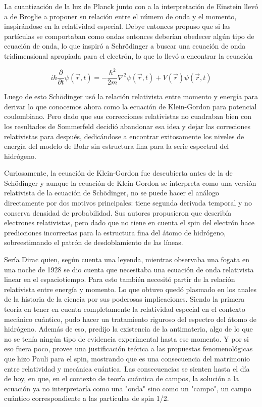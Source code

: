 \documentclass[a4paper, 12pt]{article} %
\begin{document}
La cuantizaci\'on de la luz de Planck junto con a la interpretaci\'on de Einstein llev\'o a de Broglie a proponer su relaci\'on entre el n\'umero de onda y el momento, inspir\'andose en la relatividad especial. Debye entonces propuso que si las part\'iculas se comportaban como ondas entonces deber\'ian obedecer alg\'un tipo de ecuaci\'on de onda, lo que inspir\'o a Schr\"odinger a buscar una ecuaci\'on de onda tridimensional apropiada para el electr\'on, lo que lo llev\'o a encontrar la ecuaci\'on

\begin{equation}
i\hbar\frac{\partial}{\partial t} \psi (\vec{r}, t)=-\frac{\hbar^2}{2m}\nabla^2  \psi (\vec{r}, t) + V(\vec{r}) \psi (\vec{r}, t)
\end{equation}

Luego de esto Sch\"odinger us\'o la relaci\'on relativista entre momento y energ\'ia para derivar lo que conocemos ahora como la ecuaci\'on de Klein-Gordon para potencial coulombiano. Pero dado que sus correcciones relativistas no cuadraban bien con los resultados de Sommerfeld decidi\'o abandonar esa idea y dejar las correciones relativistas para despu\'es, dedic\'andose a encontrar exitosamente los niveles de energ\'ia del modelo de Bohr sin estructura fina para la serie espectral del hidr\'ogeno. 

Curiosamente, la ecuaci\'on de Klein-Gordon fue descubierta antes de la de  Sch\"odinger y aunque la ecuaci\'on de Klein-Gordon se interpreta como una versi\'on relativista de la ecuaci\'on de Sch\"odinger, no se puede hacer el an\'alogo directamente por dos motivos principales: tiene segunda derivada temporal y no conserva densidad de probabilidad. Sus autores propusieron que describ\'ia electrones relativistas, pero dado que no tiene en cuenta el spin del electr\'on hace predicciones incorrectas para la estructura fina del \'atomo de hidr\'ogeno, sobreestimando el patr\'on de desdoblamiento de las l\'ineas.

Ser\'ia Dirac quien, seg\'un cuenta una leyenda, mientras observaba una fogata en una noche de 1928 se dio cuenta que necesitaba una ecuaci\'on de onda relativista linear en el espaciotiempo. Para esto tambi\'en necesit\'o partir de la relaci\'on relativista entre energ\'ia y momento. Lo que obtuvo qued\'o plasmado en los anales de la historia de la ciencia por sus poderosas implicaciones. Siendo la primera teor\'ia en tener en cuenta completamente la relatividad especial en el contexto mec\'anico cu\'antico, pudo hacer un tratamiento riguroso del espectro del \'atomo de hidr\'ogeno. Adem\'as de eso, predijo la existencia de la antimateria, algo de lo que no se ten\'ia ning\'un tipo de evidencia experimental hasta ese momento. Y por si eso fuera poco, provee una justificaci\'on te\'orica a las propuestas fenomenol\'ogicas que hizo Pauli para el spin, mostrando que es una consecuencia del matrimonio entre relatividad y mec\'anica cu\'antica. Las consecuencias se sienten hasta el d\'ia de hoy, en que, en el contexto de teor\'ia cu\'antica de campos, la soluci\'on a la ecuaci\'on ya no interpretar\'ia como una "onda" sino como un "campo", un campo cu\'antico correspondiente a las part\'iculas de spin 1/2.
\end{document}

